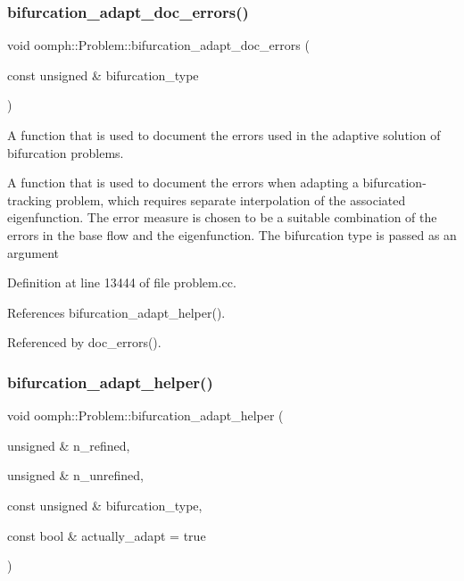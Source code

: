 \mbox{\label{classoomph_1_1Problem_ad36cedd508f3cfb352ddd44c18914d41}} 
\subsubsection{\texorpdfstring{bifurcation\+\_\+adapt\+\_\+doc\+\_\+errors()}{bifurcation\_adapt\_doc\_errors()}}
{\footnotesize\ttfamily void oomph\+::\+Problem\+::bifurcation\+\_\+adapt\+\_\+doc\+\_\+errors (\begin{DoxyParamCaption}\item[{const unsigned \&}]{bifurcation\+\_\+type }\end{DoxyParamCaption})\hspace{0.3cm}{\ttfamily [private]}}



A function that is used to document the errors used in the adaptive solution of bifurcation problems. 

A function that is used to document the errors when adapting a bifurcation-\/tracking problem, which requires separate interpolation of the associated eigenfunction. The error measure is chosen to be a suitable combination of the errors in the base flow and the eigenfunction. The bifurcation type is passed as an argument 

Definition at line 13444 of file problem.\+cc.



References bifurcation\+\_\+adapt\+\_\+helper().



Referenced by doc\+\_\+errors().

\mbox{\label{classoomph_1_1Problem_a27d31a7a78f5d01b9d0a5e07c0e06e5d}} 
\subsubsection{\texorpdfstring{bifurcation\+\_\+adapt\+\_\+helper()}{bifurcation\_adapt\_helper()}}
{\footnotesize\ttfamily void oomph\+::\+Problem\+::bifurcation\+\_\+adapt\+\_\+helper (\begin{DoxyParamCaption}\item[{unsigned \&}]{n\+\_\+refined,  }\item[{unsigned \&}]{n\+\_\+unrefined,  }\item[{const unsigned \&}]{bifurcation\+\_\+type,  }\item[{const bool \&}]{actually\+\_\+adapt = {\ttfamily true} }\end{DoxyParamCaption})\hspace{0.3cm}{\ttfamily [private]}}



